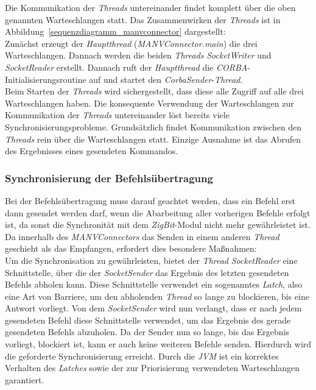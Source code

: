 Die Kommunikation der \emph{Threads} untereinander findet komplett über die oben genannten Warteschlangen statt. Das 
Zusammenwirken der \emph{Threads} ist in Abbildung~\ref{sequenzdiagramm_manvconnector} dargestellt:\\

Zunächst erzeugt der \emph{Hauptthread} (\emph{MANVConnector.main}) die drei Warteschlangen. Dannach werden die beiden 
\emph{Threads} \emph{SocketWriter} und \emph{SocketReader} erstellt. Dannach ruft der 
\emph{Hauptthread} die \emph{CORBA}-Initialisierungsroutine auf und startet den \emph{CorbaSender}-\emph{Thread}.\\

Beim Starten der \emph{Threads} wird sichergestellt, dass diese alle Zugriff auf alle drei Warteschlangen haben. Die konsequente 
Verwendung der Warteschlangen zur Kommunikation der \emph{Threads} untereinander löst bereits viele 
Synchronisierungsprobleme. Grundsätzlich findet Kommunikation zwischen den \emph{Threads} rein über die Warteschlangen 
statt. Einzige Ausnahme ist das Abrufen des Ergebnisses eines gesendeten Kommandos. 

\subsubsection{Synchronisierung der Befehlsübertragung}
Bei der Befehlsübertragung muss darauf geachtet werden, dass ein Befehl erst dann gesendet werden darf,
wenn die Abarbeitung aller vorherigen Befehle erfolgt ist, da sonst die Synchronität mit dem \emph{ZigBit}-Modul
nicht mehr gewährleistet ist. Da innerhalb des \emph{MANVConnectors} das Senden in einem anderen \emph{Thread} geschieht
als das Empfangen, erfordert dies besondere Maßnahmen:\\
Um die Synchronisation zu gewährleisten, bietet der \emph{Thread} \emph{SocketReader} eine Schnittstelle, über die der
\emph{SocketSender} das Ergebnis des letzten gesendeten Befehls abholen kann. Diese Schnittstelle verwendet ein sogenanntes
\emph{Latch}, also eine Art von Barriere, um den abholenden \emph{Thread} so lange zu blockieren, bis eine Antwort vorliegt.
Von dem \emph{SocketSender} wird nun verlangt, dass er nach jedem gesendeten Befehl diese Schnittstelle verwendet,
um das Ergebnis des gerade gesendeten Befehls abzuholen. Da der Sender nun so lange, bis das Ergebnis vorliegt, blockiert ist,
kann er auch keine weiteren Befehle senden. Hierdurch wird die geforderte Synchronisierung erreicht. Durch die \emph{JVM}
ist ein korrektes Verhalten des \emph{Latches} sowie der zur Priorisierung verwendeten Warteschlangen garantiert.
